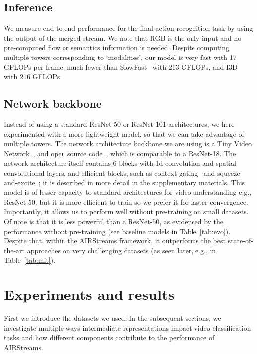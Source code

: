 \documentclass[final]{cvpr}
\begin{document}
\subsection{Inference}
We measure end-to-end performance for the final action recognition task by using the output of the merged stream. We note that RGB is the only input and no pre-computed flow or semantics information is needed. Despite computing multiple towers corresponding to `modalities', our model is very fast with 17 GFLOPs per frame, much fewer than SlowFast~\cite{feichtenhofer2018slowfast} with 213 GFLOPs, and I3D~\cite{carreira2017quo} with 216 GFLOPs.

\subsection{Network backbone}
Instead of using a standard ResNet-50 or ResNet-101 architectures, we here experimented with a more lightweight model, so that we can take advantage of multiple towers. 
The network architecture backbone we are using is a Tiny Video Network~\cite{piergiovanni2019tvn}, and open source code~\cite{piergiovanni2020tvntfhub,piergiovanni2020tvncode}, which is comparable to
a ResNet-18.
The network architecture itself contains 6 blocks with 1d convolution and spatial convolutional layers, and efficient blocks, such as context gating~\cite{xie2018rethinking} and squeeze-and-excite~\cite{hu2018squeeze}; it is described in more detail in the supplementary materials. This model is of lesser capacity to standard architectures for video understanding e.g., ResNet-50, but it is more efficient to train so we prefer it for faster convergence. Importantly, it allows us to perform well without pre-training on small datasets. Of note is that it is less powerful than a ResNet-50, as evidenced by the performance without pre-training (see baseline models in Table~\ref{tab:evo}). Despite that, within the AIRStreams framework, it outperforms the best state-of-the-art approaches on very challenging datasets (as seen later, e.g., in Table~\ref{tab:mit}).


\section{Experiments and results}
\label{sec:ablations}

First we introduce the datasets we used. In the subsequent sections, we investigate multiple ways intermediate representations impact video classification tasks and how different components contribute to the performance of AIRStreams.
\end{document}
